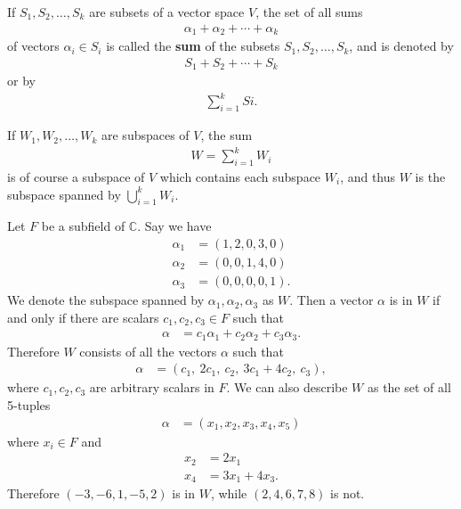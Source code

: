 \documentclass[12pt]{article}
\begin{document}
\begin{defn}
  If $S_1,S_2,\ldots,S_k$ are subsets of a vector space $V$, the set of all sums
  \begin{align*}
    \alpha_1 + \alpha_2 + \cdots + \alpha_k
  \end{align*}
  of vectors $\alpha_i \in S_i$ is called the \textbf{sum} of the subsets
  $S_1,S_2,\ldots,S_k$, and is denoted by
  \begin{align*}
    S_1 + S_2 + \cdots + S_k
  \end{align*}
  or by
  \begin{align*}
    \sum_{i = 1}^{k}Si.
  \end{align*}
\end{defn}

\begin{comm}
  If $W_1,W_2,\ldots,W_k$ are subspaces of $V$, the sum
  \begin{align*}
    W = \sum_{i = 1}^{k}W_i
  \end{align*}
  is of course a subspace of $V$ which contains each subspace $W_i$, and thus
  $W$ is the subspace spanned by $\bigcup_{i = 1}^{k}W_i$.
\end{comm}

\begin{exm}
  Let $F$ be a subfield of $\mathbb{C}$. Say we have
  \begin{align*}
    \alpha_1 &= (1,2,0,3,0)\\
    \alpha_2 &= (0,0,1,4,0)\\
    \alpha_3 &= (0,0,0,0,1).
  \end{align*}
  We denote the subspace spanned by $\alpha_1,\alpha_2,\alpha_3$ as $W$. Then a
  vector $\alpha$ is in $W$ if and only if there are scalars $c_1,c_2,c_3 \in F$ such
  that
  \begin{align*}
    \alpha &= c_1\alpha_1 + c_2\alpha_2 + c_3\alpha_3.
  \end{align*}
  Therefore $W$ consists of all the vectors $\alpha$ such that
  \begin{align*}
    \alpha &= (c_1,\ 2c_1,\ c_2,\ 3c_1+4c_2,\ c_3),
  \end{align*}
  where $c_1,c_2,c_3$ are arbitrary scalars in $F$. We can also describe $W$ as the
  set of all 5-tuples
  \begin{align*}
    \alpha &= (x_1,x_2,x_3,x_4,x_5)
  \end{align*}
  where $x_i \in F$ and
  \begin{align*}
    x_2 &= 2x_1\\
    x_4 &= 3x_1 + 4x_3.
  \end{align*}
  Therefore $(-3,-6,1,-5,2)$ is in $W$, while $(2,4,6,7,8)$ is not.
\end{exm}
\end{document}
